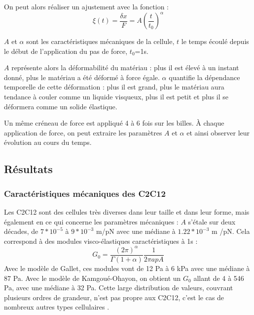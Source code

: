 On peut alors réaliser un ajustement avec la fonction : 
$$ \xi (t) = \frac{\delta x}{F}=A \left( \frac{t}{t_0} \right)^{\alpha}$$

$A$ et $\alpha$ sont les caractéristiques mécaniques de la cellule, $t$ le temps écoulé depuis le début de l'application du pas de force, $t_0$=1s. 

% 
 
 $A$ représente alors la déformabilité du matériau : plus il est élevé à un instant donné, plus le matériau a été déformé à force égale. 
 $\alpha$ quantifie la dépendance temporelle de cette déformation : plus il est grand, plus le matériau aura tendance à couler comme un liquide visqueux, plus il est petit et plus il se déformera comme un solide élastique. 

Un même créneau de force est appliqué 4 à 6 fois sur les billes. 
À chaque application de force, on peut extraire les paramètres $A$ et $\alpha$ et ainsi observer leur évolution au cours du temps. 


\subsection{Résultats}



\subsubsection{Caractéristiques mécaniques des C2C12}

Les C2C12 sont des cellules très diverses dans leur taille et dans leur forme, mais également en ce qui concerne les paramètres mécaniques : $A$ s'étale sur deux décades, de $7*10^{-5}$ à $9* 10^{-3}$ \micro m/pN avec une médiane à $1.22 * 10^{-3}$ \micro m /pN.  Cela correspond à des modules visco-élastiques caractéristiques à 1s : 
$$G_0 = \frac{(2 \pi)^{\alpha}}{\Gamma(1+\alpha)} \frac{1}{2 \pi a p A}$$ 
Avec le modèle de Gallet, ces modules vont de 12 Pa à 6 kPa avec une médiane à 87 Pa. 
Avec le modèle de Kamgoué-Ohayon, on obtient un $G_0$ allant de 4 à 546 Pa, avec une médiane à 32 Pa. Cette large distribution de valeurs, couvrant plusieurs ordres de grandeur, n'est pas propre aux C2C12, c'est le cas de nombreux autres types cellulaires \parencite{balland_dissipative_2005}. 

